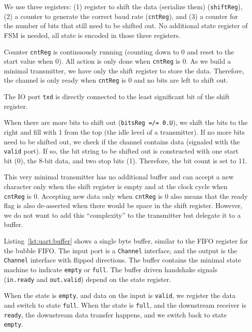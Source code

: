 \documentclass[%
    10pt,
    headinclude, footexclude,
    openright, %
    notitlepage,
    cleardoubleempty,
    headsepline,
    pointlessnumbers,
    bibtotoc, idxtotoc,
    ]{scrbook}
\newcommand{\code}[1]{{\small{\texttt{#1}}}}
\begin{document}
We use three registers:
(1) register to shift the data (serialize them) (\code{shiftReg}),
(2) a counter to generate the correct baud rate (\code{cntReg}), and
(3) a counter for the number of bits that still need to be shifted out.
No additional state register of FSM is needed, all state is encoded in
those three registers.

Counter \code{cntReg} is continuously running (counting down to 0
and reset to the start value when 0). All action is only done when
\code{cntReg} is 0. As we build a minimal transmitter, we have only
the shift register to store the data. Therefore, the channel is only ready
when \code{cntReg} is 0 and no bits are left to shift out.

The IO port \code{txd} is directly connected to the least significant bit
of the shift register.

When there are more bits to shift out (\code{bitsReg =/= 0.U}),
we shift the bits to the right and fill with 1 from the top (the idle level
of a transmitter).
If no more bits need to be shifted out, we check if the channel contains
data (signaled with the \code{valid} port). If so, the bit string to
be shifted out is constructed with one start bit (0), the 8-bit data, and
two stop bits (1). Therefore, the bit count is set to 11.

This very minimal transmitter has no additional buffer and can
accept a new character only when the shift register is empty
and at the clock cycle when \code{cntReg} is 0.
Accepting new data only when \code{cntReg} is 0 also means
that the ready flag is also de-asserted when there would be
space in the shift register. However, we do not want to add this
``complexity'' to the transmitter but delegate it to a buffer.

Listing~\ref{lst:uart:buffer} shows a single byte buffer, similar to
the FIFO register for the bubble FIFO. The input port is a \code{Channel}
interface, and the output is the \code{Channel} interface with
flipped directions. The buffer contains the minimal state machine
to indicate \code{empty} or \code{full}. The buffer driven handshake
signals (\code{in.ready} and \code{out.valid}) depend on the state
register.

When the state is \code{empty}, and data on the input is \code{valid},
we register the data and switch to state \code{full}.
When the state is \code{full}, and the downstream receiver is
\code{ready}, the downstream data transfer happens, and we switch
back to state \code{empty}.
\end{document}
